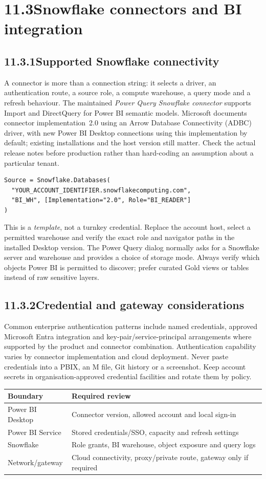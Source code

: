 \documentclass[11pt,twoside]{article}
\newcommand{\topic}[2]{\subsection*{#1\quad #2}}
\begin{document}
\section*{11.3\quad Snowflake connectors and BI integration}
\topic{11.3.1}{Supported Snowflake connectivity}
A connector is more than a connection string: it selects a driver, an authentication route, a source role, a compute warehouse, a query mode and a refresh behaviour. The maintained \emph{Power Query Snowflake connector} supports Import and DirectQuery for Power BI semantic models. Microsoft documents connector implementation~2.0 using an Arrow Database Connectivity (ADBC) driver, with new Power BI Desktop connections using this implementation by default; existing installations and the host version still matter. Check the actual release notes before production rather than hard-coding an assumption about a particular tenant.
\begin{lstlisting}[caption={Power Query M connection template; not run in Power BI.}]
Source = Snowflake.Databases(
  "YOUR_ACCOUNT_IDENTIFIER.snowflakecomputing.com",
  "BI_WH", [Implementation="2.0", Role="BI_READER"]
)
\end{lstlisting}
This is a \emph{template}, not a turnkey credential. Replace the account host, select a permitted warehouse and verify the exact role and navigator paths in the installed Desktop version. The Power Query dialog normally asks for a Snowflake server and warehouse and provides a choice of storage mode. Always verify which objects Power BI is permitted to discover; prefer curated Gold views or tables instead of raw sensitive layers.
\topic{11.3.2}{Credential and gateway considerations}
Common enterprise authentication patterns include named credentials, approved Microsoft Entra integration and key-pair/service-principal arrangements where supported by the product and connector combination. Authentication capability varies by connector implementation and cloud deployment. Never paste credentials into a PBIX, an M file, Git history or a screenshot. Keep account secrets in organisation-approved credential facilities and rotate them by policy.
\begin{center}\renewcommand{\arraystretch}{1.08}\begin{tabularx}{\linewidth}{@{}p{31mm}X@{}}\toprule
\textbf{Boundary}&\textbf{Required review}\\\midrule
Power BI Desktop&Connector version, allowed account and local sign-in\\
Power BI Service&Stored credentials/SSO, capacity and refresh settings\\
Snowflake&Role grants, BI warehouse, object exposure and query logs\\
Network/gateway&Cloud connectivity, proxy/private route, gateway only if required\\\bottomrule\end{tabularx}\end{center}
\end{document}
